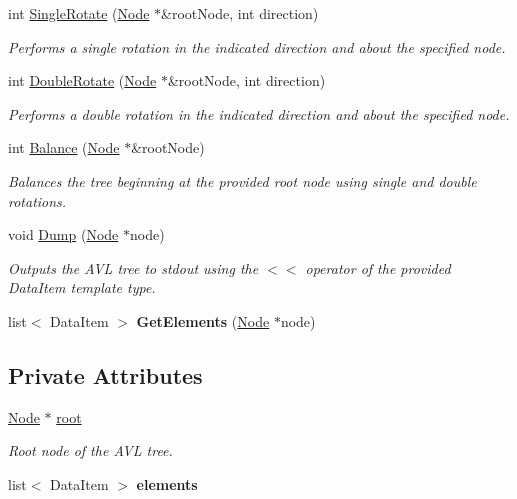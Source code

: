 \begin{DoxyCompactItemize}
\item 
int \hyperlink{classAVLTree_ac7ebd1be164c8e1d0eab990e14285957}{Single\-Rotate} (\hyperlink{structAVLTree_1_1Node}{Node} $\ast$\&root\-Node, int direction)
\begin{DoxyCompactList}\small\item\em Performs a single rotation in the indicated direction and about the specified node. \end{DoxyCompactList}\item 
int \hyperlink{classAVLTree_a7e2ed1a8d70f97fc9d4de6d9da4eb729}{Double\-Rotate} (\hyperlink{structAVLTree_1_1Node}{Node} $\ast$\&root\-Node, int direction)
\begin{DoxyCompactList}\small\item\em Performs a double rotation in the indicated direction and about the specified node. \end{DoxyCompactList}\item 
int \hyperlink{classAVLTree_aabcb2e90d12bcb172f728692bce7e7be}{Balance} (\hyperlink{structAVLTree_1_1Node}{Node} $\ast$\&root\-Node)
\begin{DoxyCompactList}\small\item\em Balances the tree beginning at the provided root node using single and double rotations. \end{DoxyCompactList}\item 
void \hyperlink{classAVLTree_aeafa2839058227c9a076d56d7929ebf7}{Dump} (\hyperlink{structAVLTree_1_1Node}{Node} $\ast$node)
\begin{DoxyCompactList}\small\item\em Outputs the A\-V\-L tree to stdout using the $<$$<$ operator of the provided Data\-Item template type. \end{DoxyCompactList}\item 
\hypertarget{classAVLTree_ad02b6a7bd1582dba503d48a8b960d902}{list$<$ Data\-Item $>$ {\bfseries Get\-Elements} (\hyperlink{structAVLTree_1_1Node}{Node} $\ast$node)}\label{classAVLTree_ad02b6a7bd1582dba503d48a8b960d902}

\end{DoxyCompactItemize}
\subsection*{Private Attributes}
\begin{DoxyCompactItemize}
\item 
\hypertarget{classAVLTree_a2a00e66c783f63a166ae0f8a5b7fbe7e}{\hyperlink{structAVLTree_1_1Node}{Node} $\ast$ \hyperlink{classAVLTree_a2a00e66c783f63a166ae0f8a5b7fbe7e}{root}}\label{classAVLTree_a2a00e66c783f63a166ae0f8a5b7fbe7e}

\begin{DoxyCompactList}\small\item\em Root node of the A\-V\-L tree. \end{DoxyCompactList}\item 
\hypertarget{classAVLTree_a45c7b885186ba43a5949ed864f0c54dd}{list$<$ Data\-Item $>$ {\bfseries elements}}\label{classAVLTree_a45c7b885186ba43a5949ed864f0c54dd}

\end{DoxyCompactItemize}


